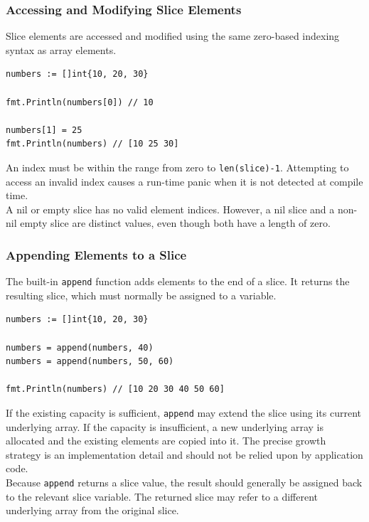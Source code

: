 \subsubsection{Accessing and Modifying Slice Elements}

Slice elements are accessed and modified using the same zero-based indexing syntax as array elements.

\begin{lstlisting}
numbers := []int{10, 20, 30}

fmt.Println(numbers[0]) // 10

numbers[1] = 25
fmt.Println(numbers) // [10 25 30]
\end{lstlisting}

An index must be within the range from zero to \texttt{len(slice)-1}. Attempting to access an invalid index causes a run-time panic when it is not detected at compile time.\\

A nil or empty slice has no valid element indices. However, a nil slice and a non-nil empty slice are distinct values, even though both have a length of zero.

\subsubsection{Appending Elements to a Slice}

The built-in \texttt{append} function adds elements to the end of a slice. It returns the resulting slice, which must normally be assigned to a variable.

\begin{lstlisting}
numbers := []int{10, 20, 30}

numbers = append(numbers, 40)
numbers = append(numbers, 50, 60)

fmt.Println(numbers) // [10 20 30 40 50 60]
\end{lstlisting}

If the existing capacity is sufficient, \texttt{append} may extend the slice using its current underlying array. If the capacity is insufficient, a new underlying array is allocated and the existing elements are copied into it. The precise growth strategy is an implementation detail and should not be relied upon by application code.\\

Because \texttt{append} returns a slice value, the result should generally be assigned back to the relevant slice variable. The returned slice may refer to a different underlying array from the original slice.

